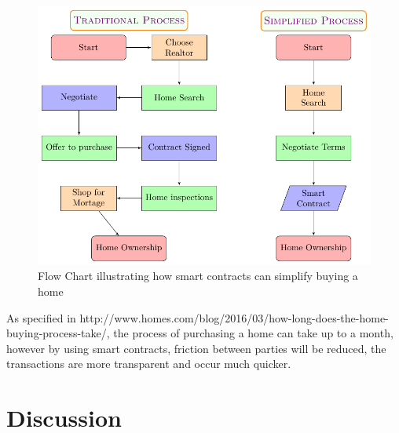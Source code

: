 \documentclass[12pt]{scrreprt}
\begin{document}
 \begin{figure}[ht]
   	\centering 
   	\includegraphics[width=0.7\linewidth]{ms-II/simplifyingPurchasingAHome.pdf}
   	\caption{Flow Chart illustrating how smart contracts can simplify buying a home}
   	\label{smartContract}
   	\end{figure}
   	
As specified in http://www.homes.com/blog/2016/03/how-long-does-the-home-buying-process-take/, the process of purchasing a home can take up to a month, however by using smart contracts, friction between parties will be reduced, the transactions are more transparent and occur much quicker.
\chapter{Discussion}


\printbibliography
\end{document}
